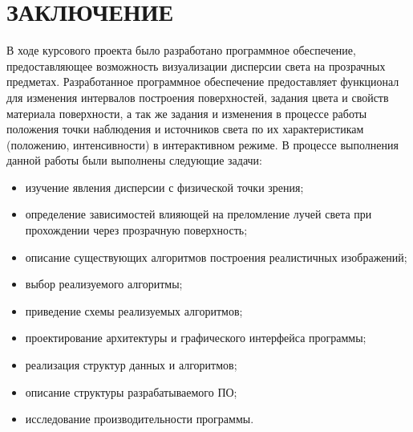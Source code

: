 \chapter*{ЗАКЛЮЧЕНИЕ}

    В ходе курсового проекта было разработано программное обеспечение, предоставляющее возможность визуализации дисперсии света на прозрачных предметах. Разработанное программное обеспечение предоставляет функционал для изменения интервалов построения поверхностей, задания цвета и свойств материала поверхности, а так же задания и изменения в процессе работы положения точки наблюдения и источников света по их характеристикам (положению, интенсивности) в интерактивном режиме. В процессе выполнения данной работы были выполнены следующие задачи:


    \begin{itemize}
        \item изучение явления дисперсии с физической точки зрения;
        \item определение зависимостей влияющей на преломление лучей света при прохождении через прозрачную поверхность;
        \item описание существующих алгоритмов построения реалистичных изображений;
        \item выбор реализуемого алгоритмы;
        \item приведение схемы реализуемых алгоритмов;
        \item проектирование архитектуры и графического интерфейса программы;
        \item реализация структур данных и алгоритмов;
	    \item описание структуры разрабатываемого ПО;
        \item исследование производительности программы.
    \end{itemize}